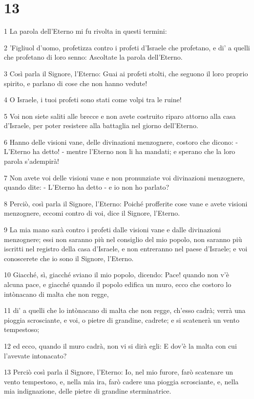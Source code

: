 \chapter{13}

\par 1 La parola dell'Eterno mi fu rivolta in questi termini:
\par 2 'Figliuol d'uomo, profetizza contro i profeti d'Israele che profetano, e di' a quelli che profetano di loro senno: Ascoltate la parola dell'Eterno.
\par 3 Così parla il Signore, l'Eterno: Guai ai profeti stolti, che seguono il loro proprio spirito, e parlano di cose che non hanno vedute!
\par 4 O Israele, i tuoi profeti sono stati come volpi tra le ruine!
\par 5 Voi non siete saliti alle brecce e non avete costruito riparo attorno alla casa d'Israele, per poter resistere alla battaglia nel giorno dell'Eterno.
\par 6 Hanno delle visioni vane, delle divinazioni menzognere, costoro che dicono: - L'Eterno ha detto! - mentre l'Eterno non li ha mandati; e sperano che la loro parola s'adempirà!
\par 7 Non avete voi delle visioni vane e non pronunziate voi divinazioni menzognere, quando dite: - L'Eterno ha detto - e io non ho parlato?
\par 8 Perciò, così parla il Signore, l'Eterno: Poiché profferite cose vane e avete visioni menzognere, eccomi contro di voi, dice il Signore, l'Eterno.
\par 9 La mia mano sarà contro i profeti dalle visioni vane e dalle divinazioni menzognere; essi non saranno più nel consiglio del mio popolo, non saranno più iscritti nel registro della casa d'Israele, e non entreranno nel paese d'Israele; e voi conoscerete che io sono il Signore, l'Eterno.
\par 10 Giacché, sì, giacché sviano il mio popolo, dicendo: Pace! quando non v'è alcuna pace, e giacché quando il popolo edifica un muro, ecco che costoro lo intònacano di malta che non regge,
\par 11 di' a quelli che lo intònacano di malta che non regge, ch'esso cadrà; verrà una pioggia scrosciante, e voi, o pietre di grandine, cadrete; e si scatenerà un vento tempestoso;
\par 12 ed ecco, quando il muro cadrà, non vi si dirà egli: E dov'è la malta con cui l'avevate intonacato?
\par 13 Perciò così parla il Signore, l'Eterno: Io, nel mio furore, farò scatenare un vento tempestoso, e, nella mia ira, farò cadere una pioggia scrosciante, e, nella mia indignazione, delle pietre di grandine sterminatrice.
